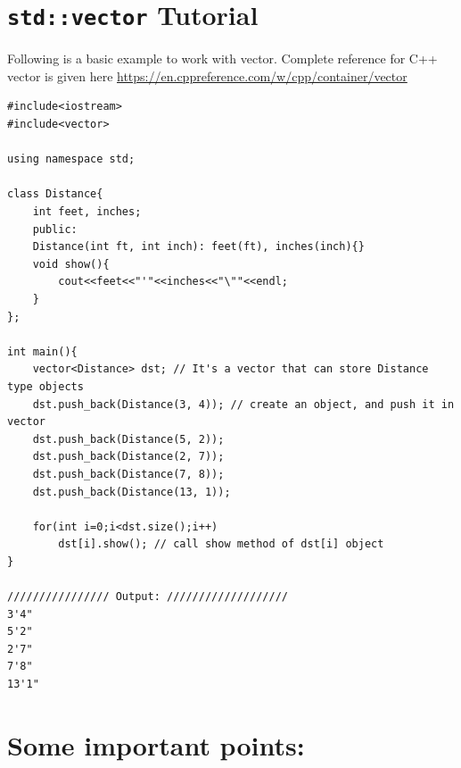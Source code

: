 \documentclass[a4paper,12pt]{article}
\begin{document}
\section{\texttt{std::vector} Tutorial}

Following is a basic example to work with vector. Complete reference for C++ vector is given here \url{https://en.cppreference.com/w/cpp/container/vector}
\begin{lstlisting}
#include<iostream>
#include<vector>

using namespace std;

class Distance{
	int feet, inches;
	public:
	Distance(int ft, int inch): feet(ft), inches(inch){}
	void show(){
		cout<<feet<<"'"<<inches<<"\""<<endl;
	}
};

int main(){
	vector<Distance> dst; // It's a vector that can store Distance type objects
	dst.push_back(Distance(3, 4)); // create an object, and push it in vector
	dst.push_back(Distance(5, 2));
	dst.push_back(Distance(2, 7));
	dst.push_back(Distance(7, 8));
	dst.push_back(Distance(13, 1));
	
	for(int i=0;i<dst.size();i++)
		dst[i].show(); // call show method of dst[i] object
}

//////////////// Output: ///////////////////
3'4"
5'2"
2'7"
7'8"
13'1"
	\end{lstlisting}

\section{Some important points:}
\end{document}
